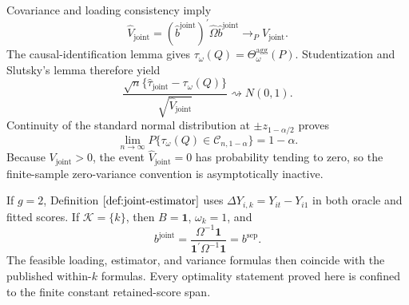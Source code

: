 Covariance and loading consistency imply
\[
 \widehat V_{\mathrm{joint}}
 =(\widehat b^{\mathrm{joint}})^{\prime}
 \widehat\Omega\widehat b^{\mathrm{joint}}
 \to_PV_{\mathrm{joint}}.
\]
The causal-identification lemma gives \(\tau_\omega(Q)=\Theta_\omega^{\mathrm{agg}}(P)\). Studentization and Slutsky's lemma therefore yield
\[
 \frac{\sqrt n\{\widehat\tau_{\mathrm{joint}}-\tau_\omega(Q)\}}
      {\sqrt{\widehat V_{\mathrm{joint}}}}
 \rightsquigarrow N(0,1).
\]
Continuity of the standard normal distribution at \(\pm z_{1-\alpha/2}\) proves
\[
 \lim_{n\to\infty}P\{\tau_\omega(Q)\in\mathcal C_{n,1-\alpha}\}=1-\alpha.
\]
Because \(V_{\mathrm{joint}}>0\), the event \(\widehat V_{\mathrm{joint}}=0\) has probability tending to zero, so the finite-sample zero-variance convention is asymptotically inactive.

If \(g=2\), Definition \(\ref{def:joint-estimator}\) uses \(\Delta Y_{i,k}=Y_{it}-Y_{i1}\) in both oracle and fitted scores. If \(\mathcal K=\{k\}\), then \(B=\mathbf 1\), \(\omega_k=1\), and
\[
 b^{\mathrm{joint}}
 =\frac{\Omega^{-1}\mathbf 1}{\mathbf 1^{\prime}\Omega^{-1}\mathbf 1}
 =b^{\mathrm{sep}}.
\]
The feasible loading, estimator, and variance formulas then coincide with the published within-\(k\) formulas. Every optimality statement proved here is confined to the finite constant retained-score span.